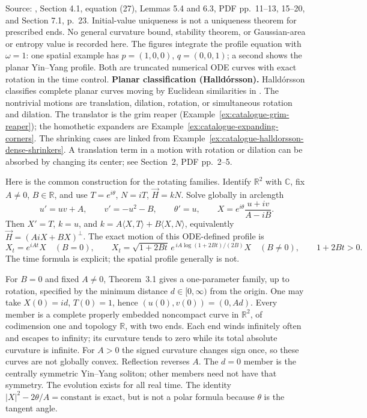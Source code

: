 \begin{example}
Source: \cite{CatAAAW13}, Section 4.1, equation (27), Lemmas 5.4 and 6.3, PDF pp.~11--13, 15--20, and Section 7.1, p.~23. Initial-value uniqueness is not a uniqueness theorem for prescribed ends. No general curvature bound, stability theorem, or Gaussian-area or entropy value is recorded here. The figures integrate the profile equation with $\omega=1$: one spatial example has $p=(1,0,0)$, $q=(0,0,1)$; a second shows the planar Yin--Yang profile. Both are truncated numerical ODE curves with exact rotation in the time control.
\textbf{Planar classification (Halld\'orsson).}
Halld\'orsson classifies complete planar curves moving by Euclidean similarities
in \cite{CatHalldorsson2012}. The nontrivial motions are translation, dilation,
rotation, or simultaneous rotation and dilation. The translator is the grim
reaper (Example~\ref{ex:catalogue-grim-reaper}); the homothetic expanders are
Example~\ref{ex:catalogue-expanding-corners}. The shrinking cases are linked from
Example~\ref{ex:catalogue-halldorsson-dense-shrinkers}. A translation term in a
motion with rotation or dilation can be absorbed by changing its center;
see Section~2, PDF pp.~2--5.

Here is the common construction for the rotating families. Identify
$\mathbb R^2$ with $\mathbb C$, fix $A\ne0$, $B\in\mathbb R$, and use
$T=e^{i\theta}$, $N=iT$, $\vec H=kN$. Solve globally in arclength
\[
 u'=uv+A,\qquad v'=-u^2-B,\qquad \theta'=u,\qquad
 X=e^{i\theta}\frac{u+iv}{A-iB}.
\]
Then $X'=T$, $k=u$, and
$k=A\langle X,T\rangle+B\langle X,N\rangle$, equivalently
$\vec H=(AiX+BX)^\perp$. The exact motion of this ODE-defined profile is
\[
 X_t=e^{iAt}X\quad(B=0),\qquad
 X_t=\sqrt{1+2Bt}\,e^{\,iA\log(1+2Bt)/(2B)}X\quad(B\ne0),
 \qquad 1+2Bt>0.
\]
The time formula is explicit; the spatial profile generally is not.

For $B=0$ and fixed $A\ne0$, Theorem~3.1 gives a one-parameter family,
up to rotation, specified by the minimum distance $d\in[0,\infty)$ from the
origin. One may take $X(0)=id$, $T(0)=1$, hence $(u(0),v(0))=(0,Ad)$.
Every member is a complete properly embedded noncompact curve in $\mathbb R^2$,
of codimension one and topology $\mathbb R$, with two ends. Each end winds
infinitely often and escapes to infinity; its curvature tends to zero while
its total absolute curvature is infinite. For $A>0$ the signed curvature
changes sign once, so these curves are not globally convex. Reflection reverses
$A$. The $d=0$ member is the centrally symmetric Yin--Yang soliton; other
members need not have that symmetry. The evolution exists for all real time.
The identity $|X|^2-2\theta/A=\text{constant}$ is exact, but is not a polar
formula because $\theta$ is the tangent angle.


\end{example}
